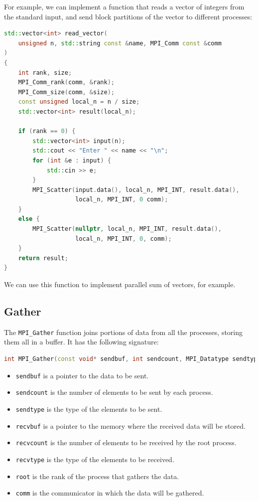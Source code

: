 For example, we can implement a function that reads a vector of integers from the standard
input, and send block partitions of the vector to different processes:

\begin{lstlisting}[language=C++]
std::vector<int> read_vector(
    unsigned n, std::string const &name, MPI_Comm const &comm
) 
{
    int rank, size;
    MPI_Comm_rank(comm, &rank);
    MPI_Comm_size(comm, &size);
    const unsigned local_n = n / size;
    std::vector<int> result(local_n);

    if (rank == 0) {
        std::vector<int> input(n);
        std::cout << "Enter " << name << "\n";
        for (int &e : input) {
            std::cin >> e;
        }
        MPI_Scatter(input.data(), local_n, MPI_INT, result.data(), 
                    local_n, MPI_INT, 0 comm);
    }
    else {
        MPI_Scatter(nullptr, local_n, MPI_INT, result.data(), 
                    local_n, MPI_INT, 0, comm);
    }
    return result;
}
\end{lstlisting}

We can use this function to implement parallel sum of vectors, for example.

\subsection{Gather}

The \texttt{MPI\_Gather} function joins portions of data from all the processes, storing 
them all in a buffer. It has the following signature:

\begin{lstlisting}[language=C++]
int MPI_Gather(const void* sendbuf, int sendcount, MPI_Datatype sendtype, void* recvbuf, int recvcount, MPI_Datatype recvtype, int root, MPI_Comm comm);
\end{lstlisting}

\begin{itemize}
    \item \texttt{sendbuf} is a pointer to the data to be sent.
    \item \texttt{sendcount} is the number of elements to be sent by each process.
    \item \texttt{sendtype} is the type of the elements to be sent.
    \item \texttt{recvbuf} is a pointer to the memory where the received data will be stored.
    \item \texttt{recvcount} is the number of elements to be received by the root process.
    \item \texttt{recvtype} is the type of the elements to be received.
    \item \texttt{root} is the rank of the process that gathers the data.
    \item \texttt{comm} is the communicator in which the data will be gathered.
\end{itemize}

